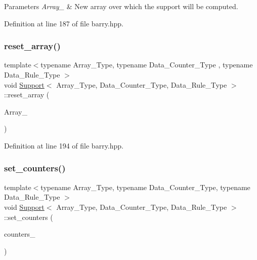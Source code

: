 \begin{DoxyParams}{Parameters}
{\em Array\+\_\+} & New array over which the support will be computed. \\
\hline
\end{DoxyParams}


Definition at line 187 of file barry.\+hpp.

\mbox{\label{classbarry_1_1_support_a6e39b22dfd1e0a0ceebf596c974f5326}} 
\subsubsection{\texorpdfstring{reset\+\_\+array()}{reset\_array()}\hspace{0.1cm}{\footnotesize\ttfamily [2/2]}}
{\footnotesize\ttfamily template$<$typename Array\+\_\+\+Type, typename Data\+\_\+\+Counter\+\_\+\+Type , typename Data\+\_\+\+Rule\+\_\+\+Type $>$ \\
void \hyperlink{classbarry_1_1_support}{Support}$<$ Array\+\_\+\+Type, Data\+\_\+\+Counter\+\_\+\+Type, Data\+\_\+\+Rule\+\_\+\+Type $>$\+::reset\+\_\+array (\begin{DoxyParamCaption}\item[{const Array\+\_\+\+Type $\ast$}]{Array\+\_\+ }\end{DoxyParamCaption})\hspace{0.3cm}{\ttfamily [inline]}}



Definition at line 194 of file barry.\+hpp.

\mbox{\label{classbarry_1_1_support_aa6070db8aa83e220b8c9a1d80dfb57c0}} 
\subsubsection{\texorpdfstring{set\+\_\+counters()}{set\_counters()}}
{\footnotesize\ttfamily template$<$typename Array\+\_\+\+Type, typename Data\+\_\+\+Counter\+\_\+\+Type, typename Data\+\_\+\+Rule\+\_\+\+Type $>$ \\
void \hyperlink{classbarry_1_1_support}{Support}$<$ Array\+\_\+\+Type, Data\+\_\+\+Counter\+\_\+\+Type, Data\+\_\+\+Rule\+\_\+\+Type $>$\+::set\+\_\+counters (\begin{DoxyParamCaption}\item[{\hyperlink{classbarry_1_1_counter_vector}{Counter\+Vector}$<$ Array\+\_\+\+Type, Data\+\_\+\+Counter\+\_\+\+Type $>$ $\ast$}]{counters\+\_\+ }\end{DoxyParamCaption})\hspace{0.3cm}{\ttfamily [inline]}}



